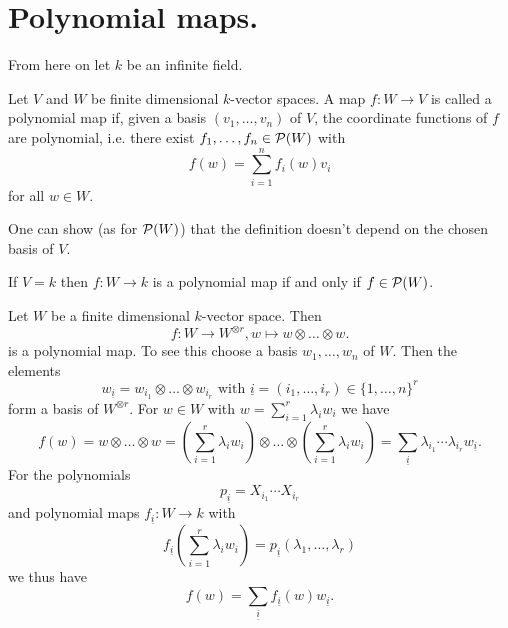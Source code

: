 

\section{Polynomial maps.}


From here on let $k$ be an infinite field.


\begin{defi}
 Let $V$ and $W$ be finite dimensional $k$-vector spaces. A map $f : W \to V$ is called a polynomial map if, given a basis $(v_1, \ldots, v_n)$ of $V$, the coordinate functions of $f$ are polynomial, i.e. there exist $f_1, \ldots, f_n \in \mathcal{P}(W)$ with
 \[
  f(w) = \sum_{i=1}^n f_i(w) v_i
 \]
 for all $w \in W$.
\end{defi}


\begin{rem}
 One can show (as for $\mathcal{P}(W)$) that the definition doesn’t depend on the chosen basis of $V$.
\end{rem}


\begin{rem}
 If $V = k$ then $f : W \to k$ is a polynomial map if and only if $f \in \mathcal{P}(W)$.
\end{rem}


\begin{expl}
 Let $W$ be a finite dimensional $k$-vector space. Then
 \[
  f : W \to W^{\otimes r}, w \mapsto w \otimes \ldots \otimes w.
 \]
 is a polynomial map. To see this choose a basis $w_1, \ldots, w_n$ of $W$. Then the elements
 \[
  w_{\underline{i}} = w_{i_1} \otimes \ldots \otimes w_{i_r} \text{ with } \underline{i} = (i_1, \ldots, i_r) \in \{1, \ldots, n\}^r
 \]
 form a basis of $W^{\otimes r}$. For $w \in W$ with $w = \sum_{i=1}^r \lambda_i w_i$ we have
 \[
  f(w)
  = w \otimes \ldots \otimes w
  = \left( \sum_{i=1}^r \lambda_i w_i \right) \otimes \ldots \otimes \left( \sum_{i=1}^r \lambda_i w_i \right)
  = \sum_{\underline{i}} \lambda_{i_1} \cdots \lambda_{i_r} w_{\underline{i}}.
 \]
 For the polynomials
 \[
  p_{\underline{i}} = X_{i_1} \cdots X_{i_r}
 \]
 and polynomial maps $f_{\underline{i}} : W \to k$ with
 \[
  f_{\underline{i}}\left(\sum_{i=1}^r \lambda_i w_i\right) = p_{\underline{i}}(\lambda_1, \ldots, \lambda_r)
 \]
 we thus have
 \[
  f(w) = \sum_{\underline{i}} f_{\underline{i}}(w) w_{\underline{i}}.
 \]
\end{expl}


